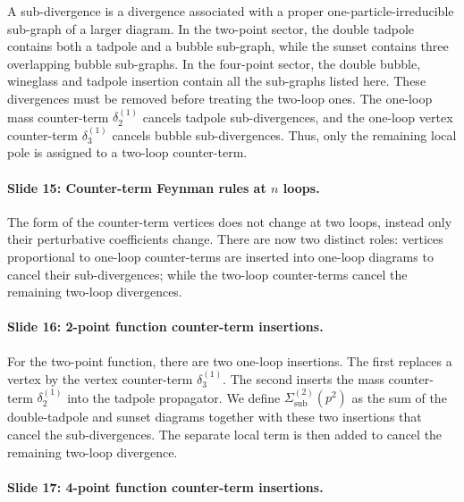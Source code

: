 \documentclass[11pt,a4paper]{article}
\begin{document}
A sub-divergence is a divergence associated with a proper one-particle-irreducible sub-graph of a larger diagram. In the two-point sector, the double tadpole contains both a tadpole and a bubble sub-graph, while the sunset contains three overlapping bubble sub-graphs. In the four-point sector, the double bubble, wineglass and tadpole insertion contain all the sub-graphs listed here. These divergences must be removed before treating the two-loop ones. The one-loop mass counter-term $\delta_2^{(1)}$ cancels tadpole sub-divergences, and the one-loop vertex counter-term $\delta_3^{(1)}$ cancels bubble sub-divergences. Thus, only the remaining local pole is assigned to a two-loop counter-term.

\paragraph{Slide 15: Counter-term Feynman rules at \texorpdfstring{$n$}{n} loops.}

The form of the counter-term vertices does not change at two loops, instead only their perturbative coefficients change. There are now two distinct roles: vertices proportional to one-loop counter-terms are inserted into one-loop diagrams to cancel their sub-divergences; while the two-loop counter-terms cancel the remaining two-loop divergences. 

\paragraph{Slide 16: 2-point function counter-term insertions.}

For the two-point function, there are two one-loop insertions. The first replaces a vertex by the vertex counter-term $\delta_3^{(1)}$. The second inserts the mass counter-term $\delta_2^{(1)}$ into the tadpole propagator. We define $\Sigma_{\mathrm{sub}}^{(2)}(p^2)$ as the sum of the double-tadpole and sunset diagrams together with these two insertions that cancel the sub-divergences. The separate local term is then added to cancel the remaining two-loop divergence.

\paragraph{Slide 17: 4-point function counter-term insertions.}
\end{document}
